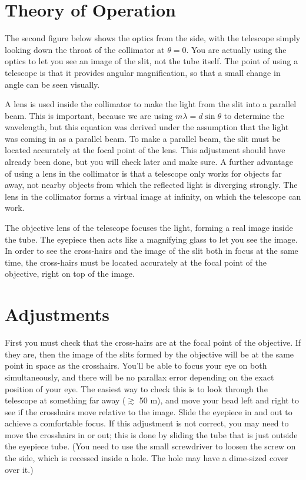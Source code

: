 \section*{Theory of Operation}

\setcounter{labpartctr}{0}


The second figure below shows the optics from the side, with the
telescope simply looking down the throat of the collimator
at $\theta=0$. You are actually using the optics to let you
see an image of the slit, not the tube itself. The point of
using a telescope is that it provides angular magnification,
so that a small change in angle can be seen visually.

A lens is used inside the collimator to make the light from
the slit into a parallel beam. This is important, because we
are using $m\lambda =d\sin\theta$ to determine the
wavelength, but this equation was derived under the
assumption that the light was coming in as a parallel beam.
To make a parallel beam, the slit must be located accurately
at the focal point of the lens. This adjustment should have
already been done, but you will check later and make sure. A
further advantage of using a lens in the collimator is that
a telescope only works for objects far away, not nearby
objects from which the reflected light is diverging
strongly.  The lens in the collimator forms a virtual image
at infinity, on which the telescope can work.

The objective lens of the telescope focuses the light,
forming a real image inside the tube. The eyepiece then acts
like a magnifying glass to let you see the image. In order
to see the cross-hairs and the image of the slit both in
focus at the same time, the cross-hairs must be located
accurately at the focal point of the objective, right
on top of the image.

\section*{Adjustments}

First you must check that the cross-hairs are at the
focal point of the objective. If they are, then the image
of the slits formed by the objective will be at the same point
in space as the crosshairs. You'll be able to focus your eye on both
simultaneously, and there will be no parallax
error depending on the exact position of your eye.
The easiest way to check this is to look through the telescope
at something far away ($\gtrsim$ 50 m), and move your head left
and right to see if the crosshairs move relative to the image.
Slide the eyepiece in and out to achieve a comfortable focus.
If this adjustment is not correct, you may
need to move the crosshairs in or out; this is done
by sliding the tube that is just outside the eyepiece tube.
(You need to use the small screwdriver to loosen the screw
on the side, which is recessed inside a hole. The hole may
have a dime-sized cover over it.)

